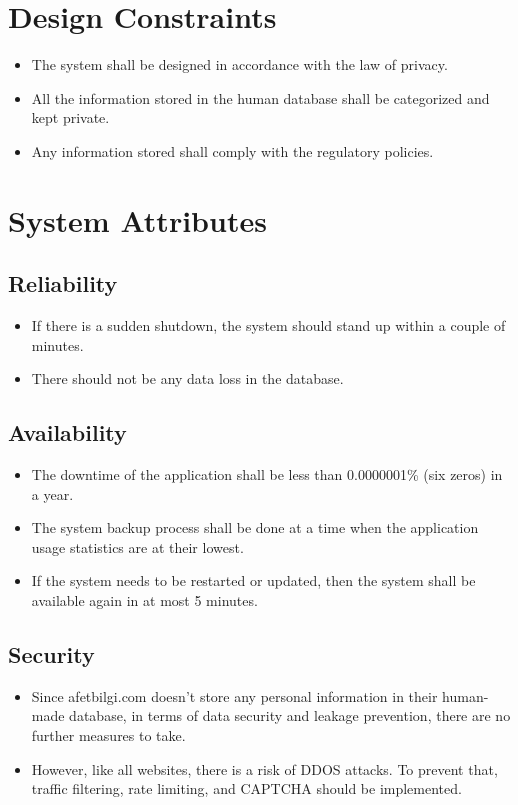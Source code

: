\documentclass[listof=nochaptergap]{report}
\begin{document}
\section{Design Constraints}
\begin{itemize}
    \item The system shall be designed in accordance with the law of privacy.
    \item All the information stored in the human database shall be categorized and kept private.
    \item Any information stored shall comply with the regulatory policies.
\end{itemize}


\section{System Attributes}

\subsection{Reliability}
\begin{itemize}
    \item If there is a sudden shutdown, the system should stand up within a couple of minutes.
    \item There should not be any data loss in the database.
\end{itemize}

\subsection{Availability}
\begin{itemize}
    \item The downtime of the application shall be less than 0.0000001\% (six zeros) in a year.
    \item The system backup process shall be done at a time when the application usage statistics are at their lowest.
    \item If the system needs to be restarted or updated, then the system shall be available again in at most 5 minutes.
\end{itemize}

\subsection{Security}
\begin{itemize}
    \item Since afetbilgi.com doesn't store any personal information in their human-made database, in terms of data security and leakage prevention, there are no further measures to take.
    \item However, like all websites, there is a risk of DDOS attacks. To prevent that, traffic filtering, rate limiting, and CAPTCHA should be implemented.
\end{itemize}
\end{document}
